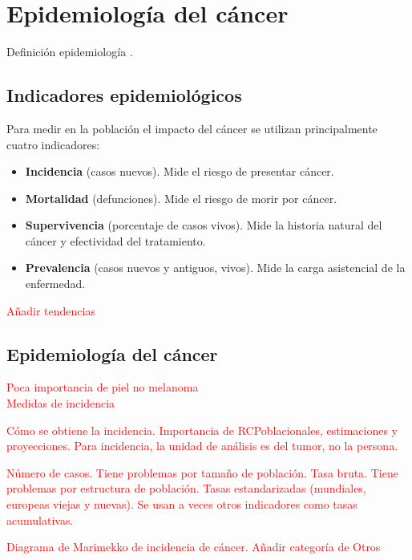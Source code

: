 \chapter{Epidemiología del cáncer}

Definición epidemiología \cite{IARC1999}.

\section{Indicadores epidemiológicos}

Para medir en la población el impacto del cáncer se utilizan principalmente cuatro indicadores:

\begin{itemize}
	\item \textbf{Incidencia} (casos nuevos). Mide el riesgo de presentar cáncer.
	\item \textbf{Mortalidad} (defunciones). Mide el riesgo de morir por cáncer.
	\item \textbf{Supervivencia} (porcentaje de casos vivos). Mide la historia natural del cáncer y efectividad del tratamiento.
	\item \textbf{Prevalencia} (casos nuevos y antiguos, vivos). Mide la carga asistencial de la enfermedad.
\end{itemize}

\textcolor{red}{Añadir tendencias}


\section{Epidemiología del cáncer}

\textcolor{red}{Poca importancia de piel no melanoma}\\






\textcolor{red}{Medidas de incidencia}

\textcolor{red}{Cómo se obtiene la incidencia. Importancia de RCPoblacionales, estimaciones y proyecciones. Para incidencia, la unidad de análisis es del tumor, no la persona.}

\textcolor{red}{Número de casos. Tiene problemas por tamaño de población. Tasa bruta. Tiene problemas por estructura de población. Tasas estandarizadas (mundiales, europeas viejas y nuevas). Se usan a veces otros indicadores como tasas acumulativas.}


\textcolor{red}{Diagrama de Marimekko de incidencia de cáncer. Añadir categoría de Otros}

